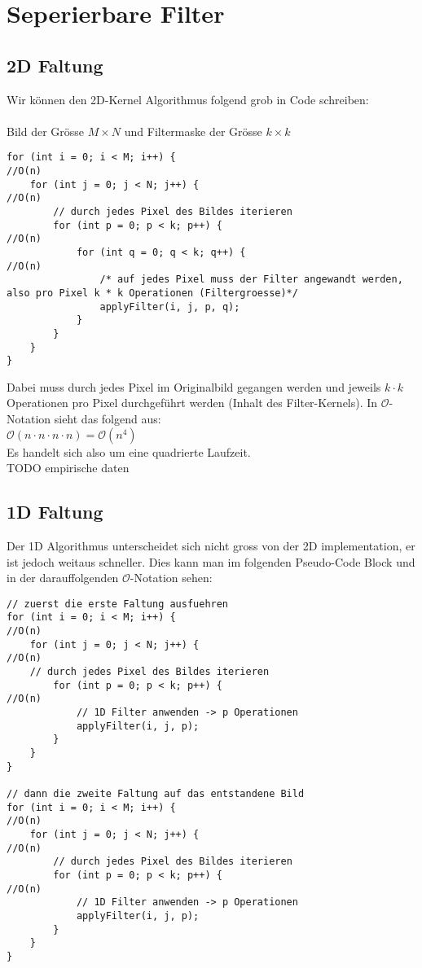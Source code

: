 \documentclass{article} %
\begin{document}
\section{Seperierbare Filter}
\subsection{2D Faltung}

Wir können den 2D-Kernel Algorithmus folgend grob in Code schreiben:\\ \\
Bild der Grösse $M \times N$ und Filtermaske der Grösse $k \times k$

\begin{lstlisting}
for (int i = 0; i < M; i++) {																								//O(n)
	for (int j = 0; j < N; j++) {																							//O(n)
		// durch jedes Pixel des Bildes iterieren
		for (int p = 0; p < k; p++) {																						//O(n)
			for (int q = 0; q < k; q++) {																					//O(n)
				/* auf jedes Pixel muss der Filter angewandt werden, also pro Pixel k * k Operationen (Filtergroesse)*/
				applyFilter(i, j, p, q);
			}
		}
	}
}
\end{lstlisting}

Dabei muss durch jedes Pixel im Originalbild gegangen werden und jeweils $k \cdot k$ Operationen pro Pixel durchgeführt werden (Inhalt des Filter-Kernels). In $\mathcal{O}$-Notation sieht das folgend aus: \\
$\mathcal{O} (n \cdot n \cdot n \cdot n) = \mathcal{O}(n^4)$ \\
Es handelt sich also um eine quadrierte Laufzeit.\\
TODO empirische daten

\subsection{1D Faltung}

Der 1D Algorithmus unterscheidet sich nicht gross von der 2D implementation, er ist jedoch weitaus schneller. Dies kann man im folgenden Pseudo-Code Block und in der darauffolgenden $\mathcal{O}$-Notation sehen:

\begin{lstlisting}
// zuerst die erste Faltung ausfuehren
for (int i = 0; i < M; i++) {													//O(n)
	for (int j = 0; j < N; j++) {												//O(n)
	// durch jedes Pixel des Bildes iterieren
		for (int p = 0; p < k; p++) {											//O(n)
			// 1D Filter anwenden -> p Operationen
			applyFilter(i, j, p);
		}
	}
}

// dann die zweite Faltung auf das entstandene Bild
for (int i = 0; i < M; i++) {													//O(n)
	for (int j = 0; j < N; j++) {												//O(n)
		// durch jedes Pixel des Bildes iterieren
		for (int p = 0; p < k; p++) {											//O(n)
			// 1D Filter anwenden -> p Operationen
			applyFilter(i, j, p);
		}
	}
}
\end{lstlisting}
\end{document}
